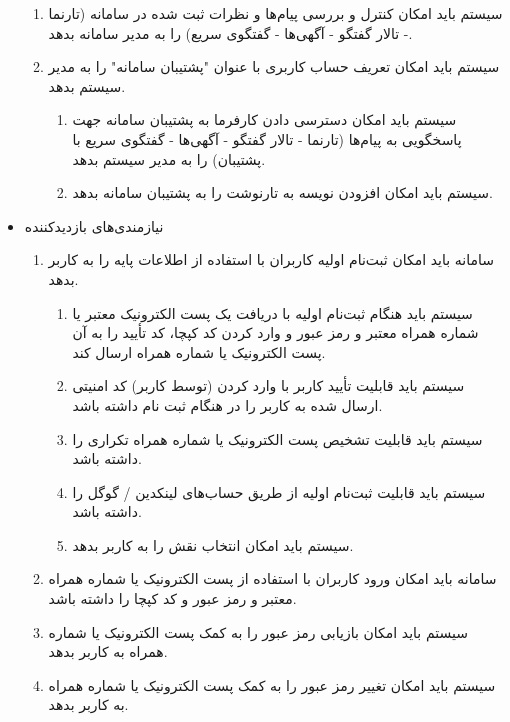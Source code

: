 \documentclass[12pt]{article}
\begin{document}
\begin{itemize}
\begin{enumerate}
			\item سیستم باید امکان کنترل و بررسی پیام‌ها و نظرات ثبت شده در سامانه (تارنما - تالار گفتگو - آگهی‌ها - گفتگوی سریع) را به مدیر سامانه بدهد.
			\item سیستم باید امکان تعریف حساب کاربری با عنوان "پشتیبان سامانه" را به مدیر سیستم بدهد.
			\begin{enumerate}
				\renewcommand{\labelenumii}{-R\arabic{enumi}.\arabic{enumii}}
				\item سیستم باید امکان دسترسی دادن کارفرما به پشتیبان سامانه جهت پاسخگویی به پیام‌ها (تارنما - تالار گفتگو - آگهی‌ها - گفتگوی سریع با پشتیبان) را به مدیر سیستم بدهد.
				\item سیستم باید امکان افزودن نویسه به تارنوشت را به پشتیبان سامانه بدهد.
			\end{enumerate}
		\end{enumerate}
		\item
		نیازمندی‌های بازدید‌کننده
		\begin{enumerate}
			\renewcommand{\labelenumi}{-R\arabic{enumi}}
			\setcounter{enumi}{14}
			\item سامانه باید امکان ثبت‌نام اولیه کاربران با استفاده از اطلاعات پایه را به کاربر بدهد.
			\begin{enumerate}
				\renewcommand{\labelenumii}{-R\arabic{enumi}.\arabic{enumii}}
				\item سیستم باید هنگام ثبت‌نام اولیه با دریافت یک‌ پست الکترونیک معتبر یا شماره همراه معتبر و رمز عبور و وارد کردن کد کپچا، کد تأیید را به آن پست الکترونیک یا شماره همراه ارسال کند.
				\item سیستم باید قابلیت تأیید کاربر با وارد کردن (توسط کاربر) کد امنیتی ارسال شده به کاربر را در هنگام ثبت نام داشته باشد.
				\item سیستم باید قابلیت تشخیص پست الکترونیک یا شماره همراه تکراری را داشته باشد.
				\item سیستم باید قابلیت ثبت‌نام اولیه از طریق حساب‌های لینکدین / گوگل را داشته باشد.
				\item سیستم باید امکان انتخاب نقش را به کاربر بدهد.
			\end{enumerate}
			\item سامانه باید امکان ورود کاربران با استفاده از پست الکترونیک یا شماره همراه معتبر و رمز عبور و کد کپچا را داشته باشد.
			\item سیستم باید امکان بازیابی رمز عبور را به کمک پست الکترونیک یا شماره همراه به کاربر بدهد.
			\item سیستم باید امکان تغییر رمز عبور را به کمک پست الکترونیک یا شماره همراه به کاربر بدهد.

\end{enumerate}
\end{itemize}
\end{document}
